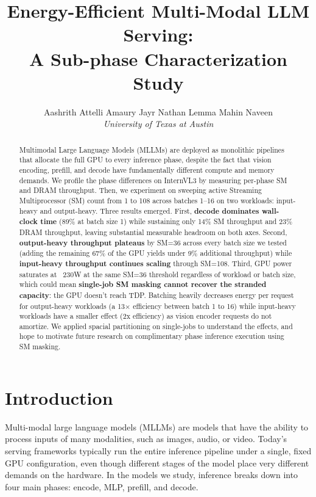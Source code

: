 \documentclass[10pt,twocolumn]{article}
\title{
    \textbf{Energy-Efficient Multi-Modal LLM Serving:\\A Sub-phase Characterization Study}
}
\author{
\large
Aashrith Attelli \quad
Amaury Jayr \quad
Nathan Lemma \quad
Mahin Naveen\\[5pt]
\itshape University of Texas at Austin
}
\date{}
\begin{document}
\maketitle

\begin{abstract}
\noindent
Multimodal Large Language Models (MLLMs) are deployed as monolithic pipelines that allocate the full GPU to every inference phase, despite the fact that vision encoding, prefill, and decode have fundamentally different compute and memory demands. We profile the phase differences on InternVL3 by measuring per-phase SM and DRAM throughput. Then, we experiment on sweeping active Streaming Multiprocessor (SM) count from 1 to 108 across batches 1–16 on two workloads: input-heavy and output-heavy. Three results emerged. First, \textbf{decode dominates wall-clock time} (89\% at batch size 1) while sustaining only 14\% SM throughput and 23\% DRAM throughput, leaving substantial measurable headroom on both axes. Second, \textbf{output-heavy throughput plateaus} by SM=36 across every batch size we tested (adding the remaining 67\% of the GPU yields under 9\% additional throughput) while \textbf{input-heavy throughput continues scaling} through SM=108. Third, GPU power saturates at ~230W at the same SM=36 threshold regardless of workload or batch size, which could mean \textbf{single-job SM masking cannot recover the stranded capacity}: the GPU doesn't reach TDP. Batching heavily decreases energy per request for output-heavy workloads (a 13× efficiency between batch 1 to 16) while input-heavy workloads have a smaller effect (2x efficiency) as vision encoder requests do not amortize. We applied spacial partitioning on single-jobs to understand the effects, and hope to motivate future research on complimentary phase inference execution using SM masking.
\end{abstract}

\section{Introduction}

Multi-modal large language models (MLLMs) are models that have the ability to process inputs of many modalities, such as images, audio, or video. Today’s serving frameworks typically run the entire inference pipeline under a single, fixed GPU configuration, even though different stages of the model place very different demands on the hardware. In the models we study, inference breaks down into four main phases: encode, MLP, prefill, and decode.
\end{document}
